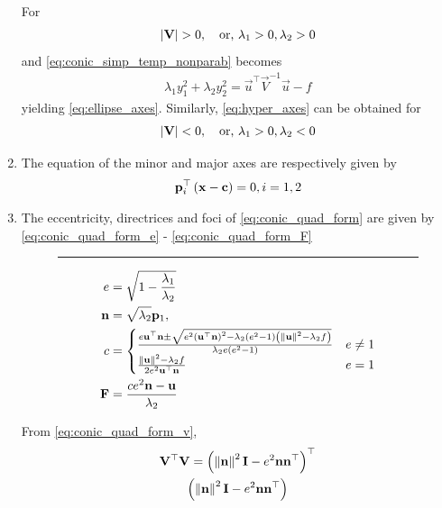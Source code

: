 \documentclass[journal,12pt,twocolumn]{IEEEtran}
\renewcommand\thesection{\arabic{section}}
\renewcommand\thesubsection{\thesection.\arabic{subsection}}
\begin{document}
\begin{enumerate}[label=\thesubsection.\arabic*.,ref=\thesubsection.\theenumi]
\begin{align}
  \label{eq:hyper_axes}
\end{align} 
\solution For \begin{align} \left\vert\mathbf{V}\right\vert > 0, \quad \text{or, } \lambda_1 > 0, \lambda_2 > 0 
  \end{align} and \eqref{eq:conic_simp_temp_nonparab} becomes \begin{align} \lambda_1y_1^2 +\lambda_2y_2^2 = 
  \vec{u}^{\top}\vec{V}^{-1}\vec{u} -f \end{align} yielding        \eqref{eq:ellipse_axes}.  Similarly, \eqref{eq:hyper_axes} can be obtained for 
  \begin{align} 
    \label{eq:conic_hyper_cond}
    \left\vert\mathbf{V}\right\vert 
    < 0, \quad \text{or, } \lambda_1 > 0, \lambda_2 < 0 \end{align}
    \item The equation of the minor and major  axes are respectively given by 
  \begin{align}
\mathbf{p}_i^{\top}\left(\mathbf{x}-\mathbf{c}\right) = 0, i = 1,2
  \end{align}
  \item The eccentricity, directrices and foci of \eqref{eq:conic_quad_form} are given by 
  \eqref{eq:conic_quad_form_e} -
  \eqref{eq:conic_quad_form_F} 
  \begin{figure}[!hb]
	  \centering
	  \hrule
\begin{align}
  \label{eq:conic_quad_form_e} 
  e&= \sqrt{1-\frac{\lambda_1}{\lambda_2}}
\\
\label{eq:conic_quad_form_nc} 
  \mathbf{n}&= \sqrt{\lambda_2}\mathbf{p}_1,  
  \\
	c &= 
  \begin{cases}
    \frac{e\mathbf{u}^{\top}\mathbf{n} \pm \sqrt{e^2\left(\mathbf{u}^{\top}\mathbf{n}\right)^2-\lambda_2\left(e^2-1\right)\left(\left\lVert\mathbf{u}\right\rVert^2 - \lambda_2 f\right)}}{\lambda_2e\left(e^2-1\right)} & e \ne 1
    \\
    \frac{\left\lVert\mathbf{u}\right\rVert^2 - \lambda_2 f   }{2e^2\mathbf{u}^{\top}\mathbf{n}} & e = 1
  \end{cases}
  \\
  \label{eq:conic_quad_form_F} 
  \mathbf{F}  &= \frac{ce^2\mathbf{n}-\mathbf{u}}{\lambda_2}
\end{align}  
  \end{figure}
\solution 
From \eqref{eq:conic_quad_form_v},
  \begin{multline}
    \vec{V}^{\top} \vec{V}=\brak{\norm{\vec{n}}^2\vec{I}-e^2\vec{n}\vec{n}^{\top}}^{\top}
	  \\
	  \brak{\norm{\vec{n}}^2\vec{I}-e^2\vec{n}\vec{n}^{\top}}

\end{multline}
\end{enumerate}
\end{document}
